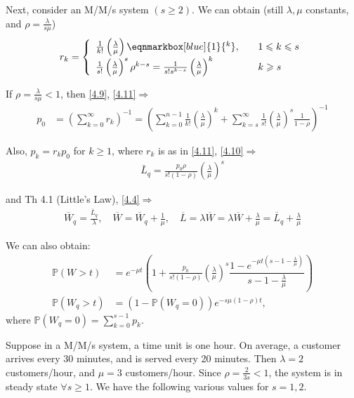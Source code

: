 Next, consider an M/M/s system $(s\geqslant 2)$. We can obtain (still $\lambda,\mu$ constants, and $\rho = \frac{\lambda}{s\mu}$)
\begin{align}
    r_k = \left\lbrace\begin{array}{ll}
        \frac{1}{k!}\left(\frac{\lambda}{\mu}\right)\eqnmarkbox[blue]{1}{^k},&\quad  1\leqslant k\leqslant s \\
        \frac{1}{s!}\left(\frac{\lambda}{\mu}\right)^s\rho^{k-s} = \frac{1}{s!s^{k-s}}\left(\frac{\lambda}{\mu}\right)^k& \quad k\geqslant s
    \end{array} \right.\label{4.11}
\end{align}

If $\rho = \frac{\lambda}{s\mu} <1$, then \ref{4.9}, \ref{4.11}$\Rightarrow$
\begin{align*}
    p_0 &= \left(\sum\limits_{k=0}^{\infty} r_k\right)^{-1} = \left(\sum\limits_{k=0}^{n-1} \frac{1}{k!}\left(\frac{\lambda}{\mu}\right)^k + \sum\limits_{k=s}^{\infty} \frac{1}{s!} \left(\frac{\lambda}{\mu}\right)^s \frac{1}{1-\rho} \right)^{-1} 
\end{align*}

Also, $p_k = r_k p_0$ for $k\geqslant 1$, where $r_k$ is as in \ref{4.11}, \ref{4.10}$\Rightarrow$
\begin{align*}
    \bar{L}_q = \frac{p_0 \rho}{s!(1-\rho)}\left(\frac{\lambda}{\mu}\right)^s
\end{align*}

and Th 4.1 (Little's Law), \ref{4.4}$\Rightarrow$
\begin{align*}
    \overline{W}_q = \frac{\overline{L}_q}{\lambda},\quad \overline{W} = \overline{W}_q + \frac{1}{\mu},\quad \overline{L} = \lambda \overline{W} = \lambda \overline{W} + \frac{\lambda}{\mu} = \overline{L}_q + \frac{\lambda}{\mu}
\end{align*}

We can also obtain:
\begin{align*}
    \mathbb{P}(W>t) &= e^{-\mu t} \left( 1 + \frac{p_0}{s!(1-\rho)} \left(\frac{\lambda}{\mu}\right)^s \dfrac{1 - e^{-\mu t(s - 1 - \frac{\lambda}{\mu})}}{ s - 1 - \frac{\lambda}{\mu}}\right) \\
    \mathbb{P}(W_q > t) &= (1-\mathbb{P}(W_q = 0))e^{-s\mu(1-\rho)t},
\end{align*}
where $\mathbb{P}(W_q = 0) = \sum\limits_{k=0}^{s-1} p_k$.

\setcounter{example}{2}
\begin{example}
    Suppose in a M/M/s system, a time unit is one hour. On average, a customer arrives every 30 minutes, and is served every 20 minutes. Then $\lambda = 2$ customers/hour, and $\mu = 3$ customers/hour. Since $\rho = \frac{2}{3s}<1$, the system is in steady state $\forall s\geqslant 1$. We have the following various values for $s = 1, 2$.
\end{example}

